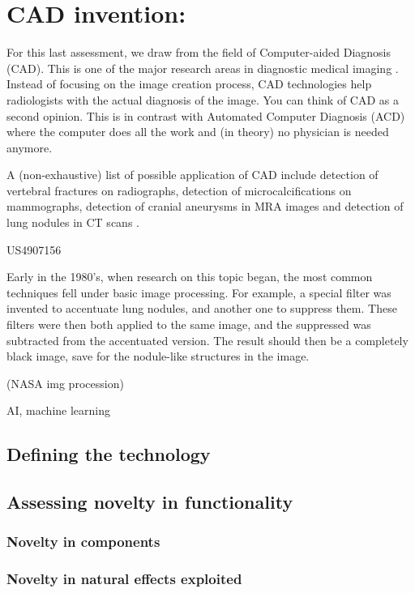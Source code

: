 \section{CAD invention: }
For this last assessment, we draw from the field of Computer-aided Diagnosis
(CAD). This is one of the major research areas in diagnostic medical imaging
\cite{cadhistory}. Instead of focusing on the image creation process, CAD
technologies help radiologists with the actual diagnosis of the image. You can
think of CAD as a second opinion. This is in contrast with Automated Computer
Diagnosis (ACD) where the computer does all the work and (in theory) no
physician is needed anymore.

A (non-exhaustive) list of possible application of CAD include detection of
vertebral fractures on radiographs, detection of microcalcifications on
mammographs, detection of cranial aneurysms in MRA images and detection of lung
nodules in CT scans \cite{cadhistory}.

US4907156 \cite{chan1990method}

Early in the 1980's, when research on this topic began, the most common
techniques fell under basic image processing. For example, a special filter was
invented to accentuate lung nodules, and another one to suppress them. These
filters were then both applied to the same image, and the suppressed
was subtracted from the accentuated version. The result should then be a
completely black image, save for the nodule-like structures in the image.

(NASA img procession)

AI, machine learning

\subsection{Defining the technology}

\subsection{Assessing novelty in functionality}

\subsubsection{Novelty in components}

\subsubsection{Novelty in natural effects exploited}

